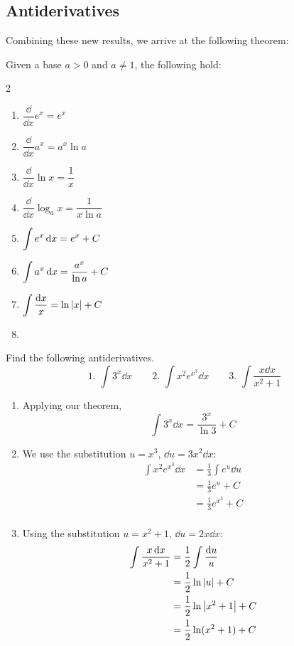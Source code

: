 \subsection{Antiderivatives}

Combining these new results, we arrive at the following theorem:

\begin{theorem}\label{thm_int_exp_log}%
Given a base $a>0$ and $a\neq 1$, the following hold:\\[-1.5\baselineskip]
\begin{multicols}{2}
\begin{enumerate}
\item $\dfrac\dd{\dd x}e^x=e^x$
\item $\dfrac\dd{\dd x}a^x=a^x\ln a$
\item $\dfrac\dd{\dd x}\ln x=\dfrac1x$
\item $\dfrac\dd{\dd x}\log_a x=\dfrac1{x\ln a}$
\item $\displaystyle\int e^x\operatorname{d}\! x=e^x+C$
\item $\displaystyle\int a^x\operatorname{d}\! x=\frac{a^x}{\ln a}+C$
\item $\displaystyle\int \frac{\operatorname{d}\! x}{x}=\ln\left\lvert x \right\rvert+C$
\item[]
\end{enumerate}
\end{multicols}
\end{theorem}

\begin{example}\label{ex_exp_log_anti}%
Find the following antiderivatives.
\[
 \text{1. }\int 3^x\dd x\qquad
 \text{2. }\int x^2 e^{x^3}\dd x\qquad
 \text{3. }\int \frac{x\dd x}{x^2+1}
\]
\solution
\begin{enumerate}
\item Applying our theorem,
\[\int 3^x\dd x=\frac{3^x}{\ln 3}+C\]
\item We use the substitution $u=x^3$, $\dd u=3x^2\dd x$:
\begin{align*}
\int x^2e^{x^3}\dd x &=\frac13 \int e^u\dd u\\
&=\frac 13 e^u+C\\
&=\frac 13 e^{x^3}+C\\
\end{align*}
\item Using the substitution $u=x^2+1$, $\dd u=2x\dd x$:
\begin{align*}
\int \frac{x\operatorname{d}\! x}{x^2+1}&=\frac 12 \int \frac{\operatorname{d}\! u}{u}\\
&=\frac 12 \ln\left\lvert u \right\rvert+C\\
&=\frac 12 \ln\left\lvert x^2+1 \right\rvert+C\\
&=\frac 12 \ln(x^2+1)+C
\end{align*}
\end{enumerate}
\end{example}

